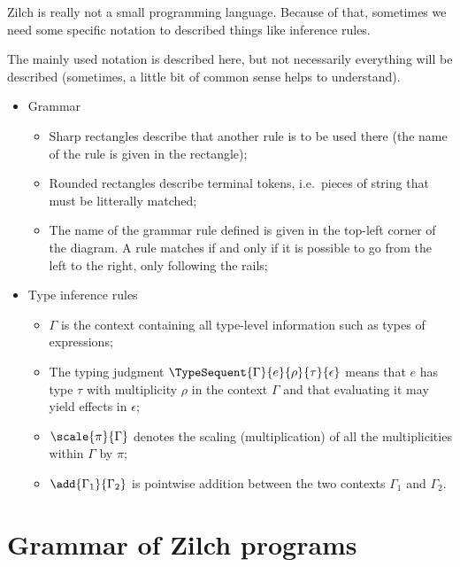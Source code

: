 Zilch is really not a small programming language.
Because of that, sometimes we need some specific notation to described things like inference rules.

The mainly used notation is described here, but not necessarily everything will be described (sometimes, a little bit of common sense helps to understand).

\begin{itemize}
	\item Grammar
	      \begin{figure}[H]
		      \centering
	      \end{figure}
	      \begin{itemize}
		      \item Sharp rectangles describe that another rule is to be used there (the name of the rule is given in the rectangle);
		      \item Rounded rectangles describe terminal tokens, i.e.\ pieces of string that must be litterally matched;
		      \item The name of the grammar rule defined is given in the top-left corner of the diagram.
		            A rule matches if and only if it is possible to go from the left to the right, only following the rails;
	      \end{itemize}
	\item Type inference rules
	      \begin{itemize}
		      \item $\Gamma$ is the context containing all type-level information such as types of expressions;
		      \item The typing judgment $\TypeSequent{\Gamma}{e}{\rho}{\tau}{\epsilon}$ means that $e$ has type $\tau$ with multiplicity $\rho$ in the context $\Gamma$ and that evaluating it may yield effects in $\epsilon$;
		      \item $\scale{\pi}{\Gamma}$ denotes the scaling (multiplication) of all the multiplicities within $\Gamma$ by $\pi$;
		      \item $\add{\Gamma_1}{\Gamma_2}$ is pointwise addition between the two contexts $\Gamma_1$ and $\Gamma_2$.
	      \end{itemize}
\end{itemize}

\chapter{Grammar of Zilch programs}\label{chap:zilch-grammar}

